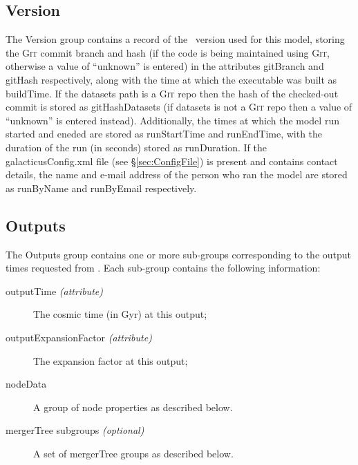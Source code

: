 \subsection{Version}

The {\normalfont \ttfamily Version} group contains a record of the \glc\ version used for this model, storing the {\normalfont \scshape Git} commit branch and hash (if the code is being maintained using {\normalfont \scshape Git}, otherwise a value of ``{\normalfont \ttfamily unknown}'' is entered) in the attributes {\normalfont \ttfamily gitBranch} and {\normalfont \ttfamily gitHash} respectively, along with the time at which the executable was built as {\normalfont \ttfamily buildTime}. If the {\normalfont \ttfamily datasets} path is a {\normalfont \scshape Git} repo then the hash of the checked-out commit is stored as {\normalfont \ttfamily gitHashDatasets} (if {\normalfont \ttfamily datasets} is not a {\normalfont \scshape Git} repo then a value of ``{\normalfont \ttfamily unknown}'' is entered instead). Additionally, the times at which the model run started and eneded are stored as {\normalfont \ttfamily runStartTime} and {\normalfont \ttfamily runEndTime}, with the duration of the run (in seconds) stored as {\normalfont \ttfamily runDuration}. If the {\normalfont \ttfamily galacticusConfig.xml} file (see \S\ref{sec:ConfigFile}) is present and contains contact details, the name and e-mail address of the person who ran the model are stored as {\normalfont \ttfamily runByName} and {\normalfont \ttfamily runByEmail} respectively.

\subsection{Outputs}

The {\normalfont \ttfamily Outputs} group contains one or more sub-groups corresponding to the output times requested from \glc. Each sub-group contains the following information:
\begin{description}
 \item[{\normalfont \ttfamily outputTime} \emph{(attribute)}] The cosmic time (in Gyr) at this output;
 \item[{\normalfont \ttfamily outputExpansionFactor} \emph{(attribute)}] The expansion factor at this output;
 \item[{\normalfont \ttfamily nodeData}] A group of node properties as described below.
 \item[{\normalfont \ttfamily mergerTree} subgroups \emph{(optional)}] A set of {\normalfont \ttfamily mergerTree} groups as described below.
\end{description}

